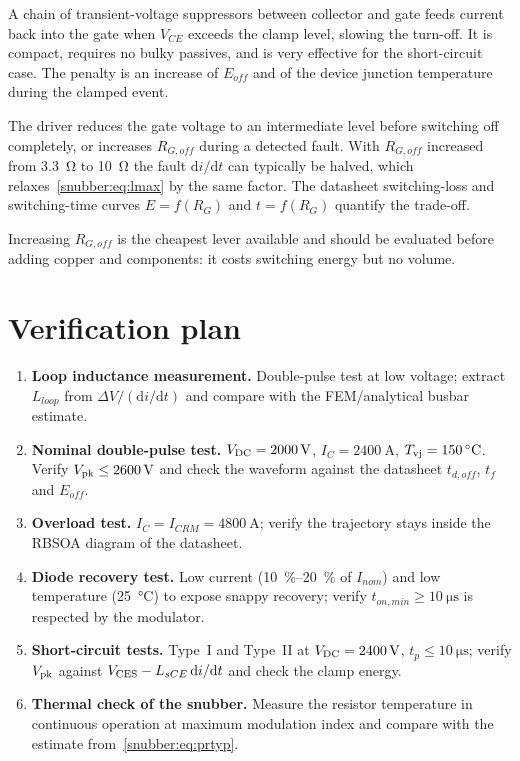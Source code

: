 \begin{description}[nosep,style=nextline]
\item[Active clamping] A chain of transient-voltage suppressors between
      collector and gate feeds current back into the gate when $V_{CE}$
      exceeds the clamp level, slowing the turn-off. It is compact, requires
      no bulky passives, and is very effective for the short-circuit case. The
      penalty is an increase of $E_{off}$ and of the device junction
      temperature during the clamped event.
\item[Two-level (soft) turn-off] The driver reduces the gate voltage to an
      intermediate level before switching off completely, or increases
      $R_{G,off}$ during a detected fault. With $R_{G,off}$ increased from
      \SI{3.3}{\ohm} to \SI{10}{\ohm} the fault $\mathrm{d}i/\mathrm{d}t$ can
      typically be halved, which relaxes~\eqref{snubber:eq:lmax} by the same factor.
      The datasheet switching-loss and switching-time curves
      $E = f(R_G)$ and $t = f(R_G)$ quantify the trade-off.
\end{description}

Increasing $R_{G,off}$ is the cheapest lever available and should be evaluated
before adding copper and components: it costs switching energy but no volume.

\section{Verification plan}

\begin{enumerate}[nosep]
\item \textbf{Loop inductance measurement.} Double-pulse test at low voltage;
      extract $L_{loop}$ from $\Delta V/(\mathrm{d}i/\mathrm{d}t)$ and compare
      with the FEM/analytical busbar estimate.
\item \textbf{Nominal double-pulse test.} $V_{\mathrm{DC}} = \SI{2000}{\volt}$,
      $I_C = \SI{2400}{\ampere}$, $T_{\mathrm{vj}} = \SI{150}{\celsius}$. Verify
      $V_{\mathrm{pk}} \le \SI{2600}{\volt}$ and check the waveform against the
      datasheet $t_{d,off}$, $t_f$ and $E_{off}$.
\item \textbf{Overload test.} $I_C = I_{CRM} = \SI{4800}{\ampere}$; verify the
      trajectory stays inside the RBSOA diagram of the datasheet.
\item \textbf{Diode recovery test.} Low current (\SIrange{10}{20}{\percent} of
      $I_{nom}$) and low temperature (\SI{25}{\celsius}) to expose snappy
      recovery; verify $t_{on,min} \ge \SI{10}{\micro\second}$ is respected by
      the modulator.
\item \textbf{Short-circuit tests.} Type~I and Type~II at
      $V_{\mathrm{DC}} = \SI{2400}{\volt}$, $t_p \le \SI{10}{\micro\second}$; verify
      $V_{\mathrm{pk}}$ against $V_{\mathrm{CES}} - L_{sCE}\,\mathrm{d}i/\mathrm{d}t$ and check the
      clamp energy.
\item \textbf{Thermal check of the snubber.} Measure the resistor temperature
      in continuous operation at maximum modulation index and compare with the
      estimate from~\eqref{snubber:eq:prtyp}.
\end{enumerate}

